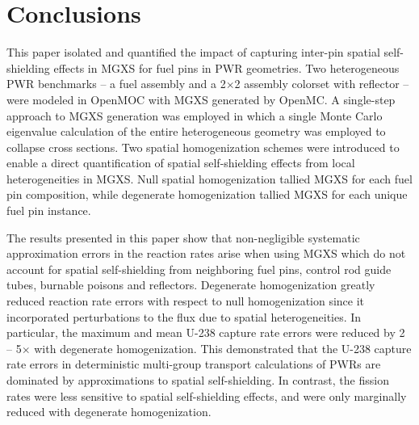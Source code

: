 \section{Conclusions}
\label{sec:conclusions}
  
This paper isolated and quantified the impact of capturing inter-pin spatial self-shielding effects in MGXS for fuel pins in PWR geometries. Two heterogeneous PWR benchmarks -- a fuel assembly and a 2$\times$2 assembly colorset with reflector -- were modeled in OpenMOC with MGXS generated by OpenMC. A single-step approach to MGXS generation was employed in which a single Monte Carlo eigenvalue calculation of the entire heterogeneous geometry was employed to collapse cross sections. Two spatial homogenization schemes were introduced to enable a direct quantification of spatial self-shielding effects from local heterogeneities in MGXS. Null spatial homogenization tallied MGXS for each fuel pin composition, while degenerate homogenization tallied MGXS for each unique fuel pin instance.


The results presented in this paper show that non-negligible systematic approximation errors in the reaction rates arise when using MGXS which do not account for spatial self-shielding from neighboring fuel pins, control rod guide tubes, burnable poisons and reflectors. Degenerate homogenization greatly reduced reaction rate errors with respect to null homogenization since it incorporated perturbations to the flux due to spatial heterogeneities. In particular, the maximum and mean U-238 capture rate errors were reduced by 2 -- 5$\times$ with degenerate homogenization. This demonstrated that the U-238 capture rate errors in deterministic multi-group transport calculations of PWRs are dominated by approximations to spatial self-shielding. In contrast, the fission rates were less sensitive to spatial self-shielding effects, and were only marginally reduced with degenerate homogenization.


